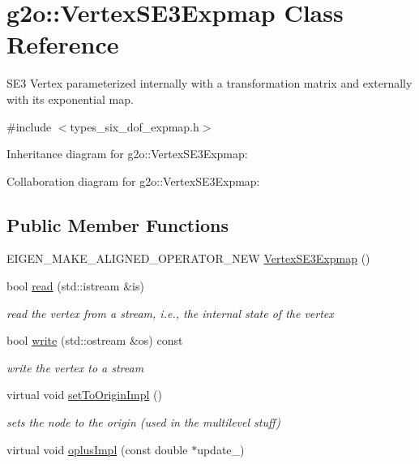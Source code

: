 \hypertarget{classg2o_1_1VertexSE3Expmap}{}\section{g2o\+:\+:Vertex\+S\+E3\+Expmap Class Reference}
\label{classg2o_1_1VertexSE3Expmap}


S\+E3 Vertex parameterized internally with a transformation matrix and externally with its exponential map.  




{\ttfamily \#include $<$types\+\_\+six\+\_\+dof\+\_\+expmap.\+h$>$}



Inheritance diagram for g2o\+:\+:Vertex\+S\+E3\+Expmap\+:


Collaboration diagram for g2o\+:\+:Vertex\+S\+E3\+Expmap\+:
\subsection*{Public Member Functions}
\begin{DoxyCompactItemize}
\item 
E\+I\+G\+E\+N\+\_\+\+M\+A\+K\+E\+\_\+\+A\+L\+I\+G\+N\+E\+D\+\_\+\+O\+P\+E\+R\+A\+T\+O\+R\+\_\+\+N\+EW \hyperlink{classg2o_1_1VertexSE3Expmap_a15fc8c37a0d056a562d4df12c872f62a}{Vertex\+S\+E3\+Expmap} ()
\item 
bool \hyperlink{classg2o_1_1VertexSE3Expmap_a4f5913373d24ea5963fffc6830406a52}{read} (std\+::istream \&is)
\begin{DoxyCompactList}\small\item\em read the vertex from a stream, i.\+e., the internal state of the vertex \end{DoxyCompactList}\item 
bool \hyperlink{classg2o_1_1VertexSE3Expmap_a0a4a06afd69669c50cf5f66c5a013e83}{write} (std\+::ostream \&os) const 
\begin{DoxyCompactList}\small\item\em write the vertex to a stream \end{DoxyCompactList}\item 
virtual void \hyperlink{classg2o_1_1VertexSE3Expmap_a0d12948c1fb058698bc58177db3806b1}{set\+To\+Origin\+Impl} ()
\begin{DoxyCompactList}\small\item\em sets the node to the origin (used in the multilevel stuff) \end{DoxyCompactList}\item 
virtual void \hyperlink{classg2o_1_1VertexSE3Expmap_a52592993e7ab5de6fe4bb0f9e00c4d39}{oplus\+Impl} (const double $\ast$update\+\_\+)
\end{DoxyCompactItemize}
